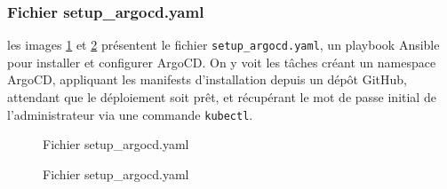 \subsubsection{Fichier setup\_argocd.yaml}
les images \ref{fig:ansible06} et \ref{fig:ansible07} présentent le fichier \texttt{setup\_argocd.yaml}, un playbook Ansible pour installer et configurer ArgoCD. On y voit les tâches créant un namespace ArgoCD, appliquant les manifests d’installation depuis un dépôt GitHub, attendant que le déploiement soit prêt, et récupérant le mot de passe initial de l’administrateur via une commande \texttt{kubectl}.
\begin{figure}[h]
    \begin{adjustwidth}{-3.5cm}{-3.5cm}
    \centering
    \caption{Fichier setup\_argocd.yaml}
    \label{fig:ansible06}
    \end{adjustwidth}
\end{figure}
\newpage
\begin{figure}[h]
    \vspace*{-1cm}
    \begin{adjustwidth}{-3.5cm}{-3.5cm}
    \centering
    \caption{Fichier setup\_argocd.yaml}
    \label{fig:ansible07}
    \end{adjustwidth}
\end{figure}
